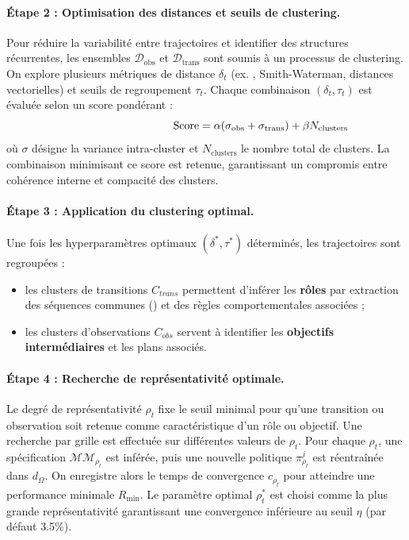 \paragraph{Étape 2 : Optimisation des distances et seuils de clustering.}
Pour réduire la variabilité entre trajectoires et identifier des structures récurrentes, les ensembles $\mathcal{D}_{\text{obs}}$ et $\mathcal{D}_{\text{trans}}$ sont soumis à un processus de clustering.
On explore plusieurs métriques de distance $\delta_t$ (ex. , Smith-Waterman, distances vectorielles) et seuils de regroupement $\tau_t$.
Chaque combinaison $(\delta_t, \tau_t)$ est évaluée selon un score pondérant :
\[
  \hspace{3.5cm}\text{Score} = \alpha (\sigma_{\text{obs}} + \sigma_{\text{trans}}) + \beta N_{\text{clusters}}
\]
où $\sigma$ désigne la variance intra-cluster et $N_{\text{clusters}}$ le nombre total de clusters.
La combinaison minimisant ce score est retenue, garantissant un compromis entre cohérence interne et compacité des clusters.

\paragraph{Étape 3 : Application du clustering optimal.}
Une fois les hyperparamètres optimaux $(\delta^*, \tau^*)$ déterminés, les trajectoires sont regroupées :
\begin{itemize}
  \item les clusters de transitions $C_{trans}$ permettent d'inférer les \textbf{rôles} par extraction des séquences communes () et des règles comportementales associées ;
  \item les clusters d'observations $C_{obs}$ servent à identifier les \textbf{objectifs intermédiaires} et les plans associés.
\end{itemize}

\paragraph{Étape 4 : Recherche de représentativité optimale.}
Le degré de représentativité $\rho_t$ fixe le seuil minimal pour qu'une transition ou observation soit retenue comme caractéristique d'un rôle ou objectif.
Une recherche par grille est effectuée sur différentes valeurs de $\rho_t$.
Pour chaque $\rho_t$, une spécification $\mathcal{MM}_{\rho_t}$ est inférée, puis une nouvelle politique $\pi^j_{\rho_t}$ est réentraînée dans $d_\Omega$.
On enregistre alors le temps de convergence $c_{\rho_t}$ pour atteindre une performance minimale $R_{\min}$.
Le paramètre optimal $\rho_t^*$ est choisi comme la plus grande représentativité garantissant une convergence inférieure au seuil $\eta$ (par défaut 3.5\%).

